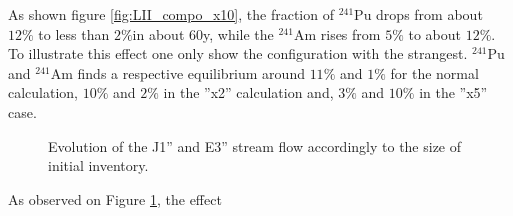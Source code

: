 \documentclass[10pt]{article}
\begin{document}
As shown figure \ref{fig:LII_compo_x10}, the fraction of $^{241}$Pu drops from
about $12\%$ to less than $2\%$in about 60y, while the $^{241}$Am rises from
$5\%$ to about $12\%$. To illustrate this effect one only show the configuration
with the strangest. $^{241}$Pu and $^{241}$Am finds a respective equilibrium
around $11\%$ and $1\%$ for the normal calculation, $10\%$ and $2\%$ in the
''x2'' calculation and, $3\%$ and $10\%$ in the ''x5'' case. 


\begin{figure}[h!]
  \centering
  

  \caption{ Evolution of the J1'' and E3'' stream flow accordingly to the size
    of initial inventory. \label{fig:LII} } 
  \end{figure}

 As observed on Figure \ref{fig:LII}, the effect 






\end{document}

